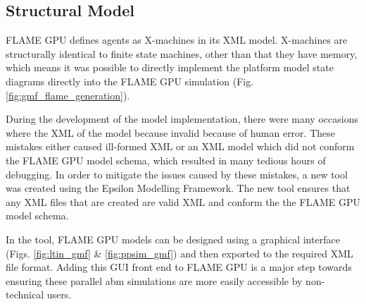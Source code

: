 \documentclass{UoYCSproject}
\begin{document}
\subsection{Structural Model}
\gls{FLAME GPU} defines agents as X-machines in its XML model.
X-machines are structurally identical to finite state machines, other than that they have memory, which means it was possible to directly implement the platform model state diagrams directly into the \gls{FLAME GPU} simulation (Fig. \ref{fig:gmf_flame_generation}).

During the development of the model implementation, there were many occasions where the XML of the model because invalid because of human error.
These mistakes either caused ill-formed XML or an XML model which did not conform the \gls{FLAME GPU} model schema, which resulted in many tedious hours of debugging.
In order to mitigate the issues caused by these mistakes, a new tool was created using the Epsilon Modelling Framework.
The new tool ensures that any XML files that are created are valid XML and conform the the \gls{FLAME GPU} model schema.

In the tool, \gls{FLAME GPU} models can be designed using a graphical interface (Figs. \ref{fig:ltin_gmf} \& \ref{fig:ppsim_gmf}) and then exported to the required XML file format.
Adding this GUI front end to \gls{FLAME GPU} is a major step towards ensuring these parallel \gls{abm} simulations are more easily accessible by non-technical users.
\end{document}
